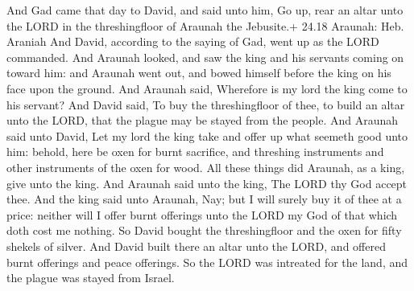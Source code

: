  And Gad came that day to David, and said unto him, Go up,
rear an altar unto the LORD in the threshingfloor of Araunah the
Jebusite.+ 24.18 Araunah: Heb. Araniah  And David,
according to the saying of Gad, went up as the LORD commanded.
 And Araunah looked, and saw the king and his servants
coming on toward him: and Araunah went out, and bowed himself before the
king on his face upon the ground.  And Araunah said,
Wherefore is my lord the king come to his servant? And David said, To
buy the threshingfloor of thee, to build an altar unto the LORD, that
the plague may be stayed from the people.  And Araunah said
unto David, Let my lord the king take and offer up what seemeth good
unto him: behold, here be oxen for burnt sacrifice, and threshing
instruments and other instruments of the oxen for wood. 
All these things did Araunah, as a king, give unto the king. And Araunah
said unto the king, The LORD thy God accept thee.  And the
king said unto Araunah, Nay; but I will surely buy it of thee at a
price: neither will I offer burnt offerings unto the LORD my God of that
which doth cost me nothing. So David bought the threshingfloor and the
oxen for fifty shekels of silver.  And David built there an
altar unto the LORD, and offered burnt offerings and peace offerings. So
the LORD was intreated for the land, and the plague was stayed from
Israel.
